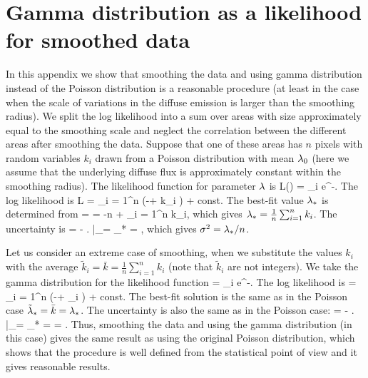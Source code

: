 \newpage
\section{Gamma distribution as a likelihood for smoothed data}

In this appendix we show that smoothing the data and using gamma distribution instead of the Poisson distribution
is a reasonable procedure (at least in the case when the scale of variations in the diffuse emission is larger than the smoothing radius).
We split the log likelihood into a sum over areas with size approximately equal to the smoothing scale
and neglect the correlation between the different areas after smoothing the data.
Suppose that one of these areas has $n$ pixels with random variables $k_i$ drawn from a Poisson distribution with mean $\lambda_0$
(here we assume that the underlying diffuse flux is approximately constant within the smoothing radius).
The likelihood function for parameter $\lambda$ is
\be
L(\ld) = \prod_i  e^{-\ld}.
\ee
The log likelihood is
\be
\log L = \sum_{i = 1}^n (-\ld + k_i \log \ld) + const.
\ee
The best-fit value $\lambda_*$ is determined from
 =  = -n +  \sum_{i = 1}^n k_i,
\ee
which gives $\lambda_* = \frac{1}{n} \sum_{i = 1}^n k_i$.
The uncertainty is
\be
{} = - \left.  \right|_{\ld = \ld_*} = ,
\ee
which gives $\sigma^2 = \lambda_* / n$.

Let us consider an extreme case of smoothing, when we substitute the values $k_i$ with the average $\tilde{k}_i = \bar{k} = \frac{1}{n} \sum_{i = 1}^n k_i$
(note that $\tilde{k}_i$ are not integers).
We take the gamma distribution for the likelihood function 
\be
{} = \prod_i  e^{-\ld}.
\ee
The log likelihood is
\be
\log {} = \sum_{i = 1}^n (-\ld + _i \log \ld) + const.
\ee
The best-fit solution is the same as in the Poisson case $\tilde{\lambda}_* = \bar{k} = {\lambda}_*$.
The uncertainty is also the same as in the Poisson case:
\be
{} = - \left.  \right|_{\ld = \td{\ld}_*} =  = .
\ee
Thus, smoothing the data and using the gamma distribution (in this case) gives the same result as using the original Poisson distribution,
which shows that the procedure is well defined from the statistical point of view and it gives reasonable results.